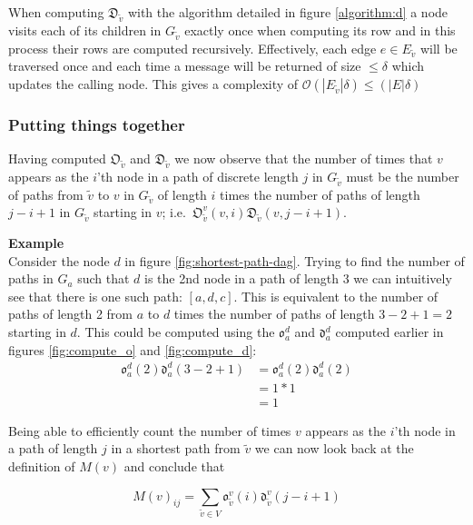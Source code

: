 \documentclass{article}
\begin{document}
When computing $\mathfrak{D}_{\tilde{v}}$ with the algorithm detailed in figure \ref{algorithm:d} a node visits each of its children in $G_{\tilde{v}}$ exactly once when computing its row and in this process their rows are computed recursively. Effectively, each edge $e\in E_{\tilde{v}}$ will be traversed once and each time a message will be returned of size $\leq \delta$ which updates the calling node. This gives a complexity of $\mathcal{O}(|E_{\tilde{v}}|\delta)\leq(|E|\delta)$


\subsubsection{Putting things together}
Having computed $\mathfrak{O}_{\tilde{v}}$ and $\mathfrak{D}_{\tilde{v}}$ we now observe that the number of times that $v$ appears as the $i$'th node in a path of discrete length $j$ in $G_{\tilde{v}}$ must be the number of paths from $\tilde{v}$ to $v$ in $G_{\tilde{v}}$ of length $i$ times the number of paths of length $j-i+1$ in $G_{\tilde{v}}$ starting in $v$; i.e.\ $\mathfrak{O}_{\tilde{v}}^v(v,i)\mathfrak{D}_{\tilde{v}}(v,j - i + 1)$.

\textbf{Example}\\
Consider the node $d$ in figure \ref{fig:shortest-path-dag}. Trying to find the number of paths in $G_{a}$ such that $d$ is the 2nd node in a path of length 3 we can intuitively see that there is one such path: $[a,d,c]$. This is equivalent to the number of paths of length 2 from $a$ to $d$ times the number of paths of length $3-2+1=2$ starting in $d$.
This could be computed using the $\mathfrak{o}_a^d$ and $\mathfrak{d}_a^d$ computed earlier in figures \ref{fig:compute_o} and \ref{fig:compute_d}:
\begin{align}
\mathfrak{o}_a^d(2)\mathfrak{d}_a^d(3-2+1)&=\mathfrak{o}_a^d(2)\mathfrak{d}_a^d(2)\\
&=1 * 1\\
&=1
\end{align}

Being able to efficiently count the number of times $v$ appears as the $i$'th node in a path of length $j$ in a shortest path from $\tilde{v}$ we can now look back at the definition of $M(v)$ and conclude that

\begin{equation}
M(v)_{ij} = \sum_{\tilde{v}\in V}\mathfrak{o}_{\tilde{v}}^v(i)\mathfrak{d}_{\tilde{v}}^v(j-i+1)
\label{eq:runtime_comp_m}
\end{equation}
\end{document}
